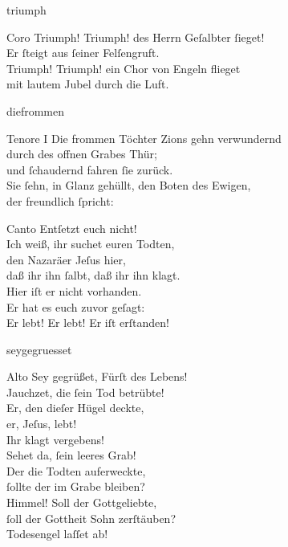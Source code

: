 \documentclass[tocstyle=ref-genre]{ees}
\begin{document}
{\begin{movement}{triumph}
  \item[Coro]\enlargethispage\baselineskip
  Triumph! Triumph! des Herrn Geſalbter ſieget!\\
  Er ſteigt aus ſeiner Felſengruft.\\
  Triumph! Triumph! ein Chor von Engeln flieget\\
  mit lautem Jubel durch die Luft.
\end{movement}

\begin{movement}{diefrommen}
  \item[Tenore I]
  Die frommen Töchter Zions gehn verwundernd\\
  durch des offnen Grabes Thür;\\
  und ſchaudernd fahren ſie zurück.\\
  Sie ſehn, in Glanz gehüllt, den Boten des Ewigen,\\
  der freundlich ſpricht:

  \item[Canto]
  Entſetzt euch nicht!\\
  Ich weiß, ihr suchet euren Todten,\\
  den Nazaräer Jeſus hier,\\
  daß ihr ihn ſalbt, daß ihr ihn klagt.\\
  Hier iſt er nicht vorhanden.\\
  Er hat es euch zuvor geſagt:\\
  Er lebt! Er lebt! Er iſt erſtanden!
\end{movement}

\begin{movement}{seygegruesset}
  \item[Alto]
  Sey gegrüßet, Fürſt des Lebens!\\
  Jauchzet, die ſein Tod betrübte!\\
  Er, den dieſer Hügel deckte,\\
  er, Jeſus, lebt!\\
  Ihr klagt vergebens!\\
  Sehet da, ſein leeres Grab!\\
  Der die Todten auferweckte,\\
  ſollte der im Grabe bleiben?\\
  Himmel! Soll der Gottgeliebte,\\
  ſoll der Gottheit Sohn zerſtäuben?\\
  Todesengel laſſet ab!
\end{movement}

}
\end{document}
